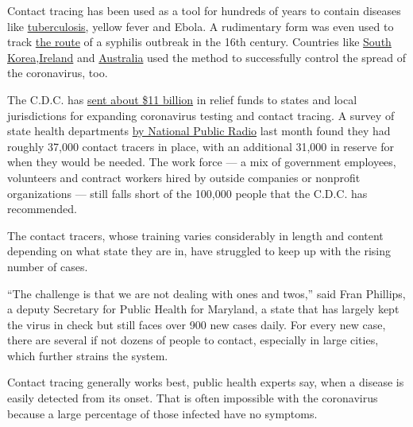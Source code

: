 Contact tracing has been used as a tool for hundreds of years to contain
diseases like
\href{https://www.who.int/tb/areas-of-work/laboratory/contact-investigation/en/}{tuberculosis},
yellow fever and Ebola. A rudimentary form was even used to track
\href{https://theconversation.com/contact-tracing-how-physicians-used-it-500-years-ago-to-control-the-bubonic-plague-139248}{the
route} of a syphilis outbreak in the 16th century. Countries like
\href{https://www.forbes.com/sites/alexandrasternlicht/2020/04/30/south-koreas-widespread-testing-and-contact-tracing-lead-to-first-day-with-no-new-cases/}{South
Korea},\href{https://www.theguardian.com/world/2020/jul/20/cheap-popular-and-it-works-irelands-contact-tracing-app-success?CMP=Share_iOSApp_Other}{Ireland}
and
\href{https://www.aei.org/technology-and-innovation/a-tale-of-two-contact-tracing-apps-lessons-from-australia-and-new-zealand/}{Australia}
used the method to successfully control the spread of the coronavirus,
too.

The C.D.C. has
\href{https://www.hhs.gov/about/news/2020/05/18/hhs-delivers-funding-to-expand-testing-capacity-for-states-territories-tribes.html}{sent
about \$11 billion} in relief funds to states and local jurisdictions
for expanding coronavirus testing and contact tracing. A survey of state
health departments
\href{https://www.npr.org/sections/health-shots/2020/06/18/879787448/as-states-reopen-do-they-have-the-workforce-they-need-to-stop-coronavirus-outbre}{by
National Public Radio} last month found they had roughly 37,000 contact
tracers in place, with an additional 31,000 in reserve for when they
would be needed. The work force --- a mix of government employees,
volunteers and contract workers hired by outside companies or nonprofit
organizations --- still falls short of the 100,000 people that the
C.D.C. has recommended.

The contact tracers, whose training varies considerably in length and
content depending on what state they are in, have struggled to keep up
with the rising number of cases.

``The challenge is that we are not dealing with ones and twos,'' said
Fran Phillips, a deputy Secretary for Public Health for Maryland, a
state that has largely kept the virus in check but still faces over 900
new cases daily. For every new case, there are several if not dozens of
people to contact, especially in large cities, which further strains the
system.

Contact tracing generally works best, public health experts say, when a
disease is easily detected from its onset. That is often impossible with
the coronavirus because a large percentage of those infected have no
symptoms.

